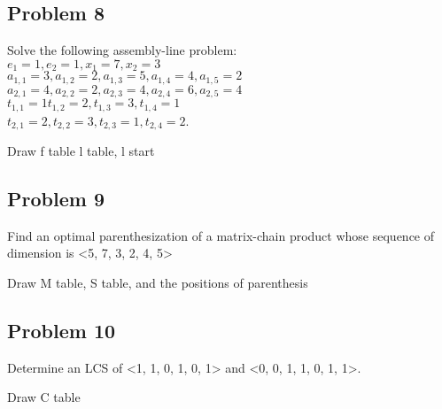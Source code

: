 \documentclass[a4paper]{article}
\makeatletter
\newenvironment{solution}
  {\begin{proof}[Solution]}
  {\end{proof}}
\renewenvironment{proof}[1][\proofname]{%
  \par\pushQED{\qed}\normalfont%
  \topsep6\p@\@plus6\p@\relax
  \trivlist\item[\hskip\labelsep\bfseries#1\@addpunct{.}]%
  \ignorespaces
}{%
  \popQED\endtrivlist\@endpefalse
}
\makeatother
\begin{document}
\subsection*{Problem 8}
Solve the following assembly-line problem: \\ $e_1=1, e_2=1, x_1=7,x_2=3$ \\ $a_{1,1}=3, a_{1,2}=2,a_{1,3}=5, a_{1,4}=4, a_{1,5}=2$ \\ $a_{2,1}=4, a_{2,2}=2, a_{2,3}=4, a_{2,4}=6, a_{2,5}=4$ \\ $t_{1,1}=1 t_{1,2}=2, t_{1,3}=3, t_{1,4}=1$ \\ $t_{2,1}=2, t_{2,2}=3, t_{2,3}=1, t_{2,4}=2$.
\begin{solution}
Draw f table
l table, l start
\end{solution}

\subsection*{Problem 9}
Find an optimal parenthesization of a matrix-chain product whose sequence of dimension is <5, 7, 3, 2, 4, 5>
\begin{solution}
Draw M table, S table, and the positions of parenthesis
\end{solution}

\subsection*{Problem 10}
Determine an LCS of <1, 1, 0, 1, 0, 1> and <0, 0, 1, 1, 0, 1, 1>.
\begin{solution}
Draw C table
\end{solution}
\end{document}
